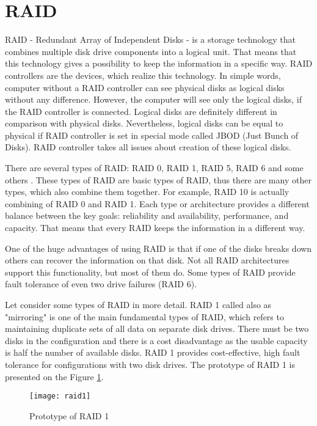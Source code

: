 \newpage
\section{RAID}
RAID - Redundant Array of Independent Disks - is a storage technology that combines multiple disk drive components into a logical unit. That means that this technology gives a possibility to keep the information in a specific way. RAID controllers are the devices, which realize this technology. In simple words, computer without a RAID controller can see physical disks as logical disks without any difference. However, the computer will see only the logical disks, if the RAID controller is connected. Logical disks are definitely different in comparison with physical disks. Nevertheless, logical disks can be equal to physical if RAID controller is set in special mode called JBOD (Just Bunch of Disks). RAID controller takes all issues about creation of these logical disks.

There are several types of RAID: RAID 0, RAID 1, RAID 5, RAID 6 and some others \cite{which_raid}. These types of RAID are basic types of RAID, thus there are many other types, which also combine them together. For example, RAID 10 is actually combining of RAID 0 and RAID 1. Each type or architecture provides a different balance between the key goals: reliability and availability, performance, and capacity. That means that every RAID keeps the information in a different way. 

One of the huge advantages of using RAID is that if one of the disks breaks down others can recover the information on that disk. Not all RAID architectures support this functionality, but most of them do. Some types of RAID provide fault tolerance of even two drive failures (RAID 6).

Let consider some types of RAID in more detail. RAID 1 called also as "mirroring" is one of the main fundamental types of RAID, which refers to maintaining duplicate sets of all data on separate disk drives. There must be two disks in the configuration and there is a cost disadvantage as the usable capacity is half the number of available disks. RAID 1 provides cost-effective, high fault tolerance for configurations with two disk drives. The prototype of RAID 1 is presented on the Figure \ref{fig:raid1}.
\begin{figure}[h!]
\begin{center}
  \texttt{[image: raid1]}
\end{center}
  \caption{Prototype of RAID 1}
  \label{fig:raid1}
\end{figure}

